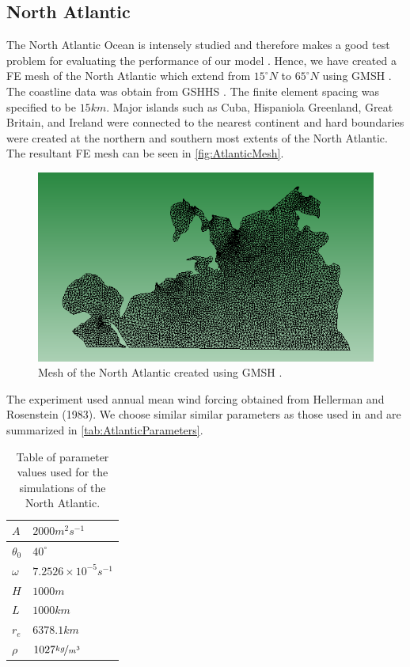 \subsection{North Atlantic}
The North Atlantic Ocean is intensely studied and therefore makes a good test
problem for evaluating the performance of our model \cite{Myers}. Hence, we have
created a FE mesh of the North Atlantic which extend from $15^\circ N$ to $65^\circ
N$ using GMSH \cite{GMSH}. The coastline data was obtain from GSHHS \cite{GSHHS}.
The finite element spacing was specified to be {\color{red} $15km$}.  Major
islands such as Cuba, Hispaniola Greenland, Great Britain, and Ireland were
connected to the nearest continent and hard boundaries were created at the
northern and southern most extents of the North Atlantic. The resultant FE mesh
can be seen in \autoref{fig:AtlanticMesh}.

\begin{figure}
  \begin{center}
    \includegraphics[scale=0.5]{NAMesh.png}
    \caption{Mesh of the North Atlantic created using GMSH \cite{GMSH}.}
    \label{fig:AtlanticMesh}
  \end{center}
\end{figure}

The experiment used annual mean wind forcing obtained from Hellerman and
Rosenstein (1983). We choose similar similar parameters as those used in
\cite{delSastre04} and are summarized in \autoref{tab:AtlanticParameters}.

\begin{table}
  \begin{center}
  \begin{tabular}{|l|l|}
    \hline
    $A$ & $2000m^2s^{-1}$\\
    \hline
    $\theta_0$ & $40^\circ$ \\
    \hline
    $\omega$ & $7.2526\times 10^{-5}s^{-1}$ \\
    \hline
    $H$ & $1000m$ \\
    \hline
    $L$ & $1000km$ \\
    \hline
    $r_e$ & $6378.1km$ \\
    \hline
    $\rho$ & $1027 \nicefrac{kg}{m^3}$ \\
    \hline
  \end{tabular}
  \end{center}
  \caption{Table of parameter values used for the simulations of the North
    Atlantic. \cite{delSastre04}}
  \label{tab:AtlanticParameters}
\end{table}

